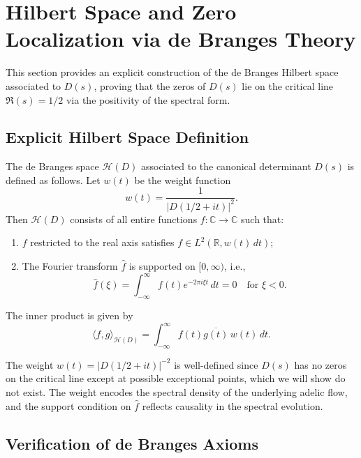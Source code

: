 \section{Hilbert Space and Zero Localization via de Branges Theory}

This section provides an explicit construction of the de Branges Hilbert space associated to $D(s)$, proving that the zeros of $D(s)$ lie on the critical line $\Re(s) = 1/2$ via the positivity of the spectral form.

\subsection{Explicit Hilbert Space Definition}

\begin{definition}\label{def:debranges-space}
The de Branges space $\mathcal{H}(D)$ associated to the canonical determinant $D(s)$ is defined as follows. Let $w(t)$ be the weight function
\[
w(t) = \frac{1}{|D(1/2 + it)|^2}.
\]
Then $\mathcal{H}(D)$ consists of all entire functions $f: \mathbb{C} \to \mathbb{C}$ such that:
\begin{enumerate}
\item $f$ restricted to the real axis satisfies $f \in L^2(\mathbb{R}, w(t) \, dt)$;
\item The Fourier transform $\hat{f}$ is supported on $[0, \infty)$, i.e.,
\[
\hat{f}(\xi) = \int_{-\infty}^{\infty} f(t) e^{-2\pi i \xi t} \, dt = 0 \quad \text{for } \xi < 0.
\]
\end{enumerate}
The inner product is given by
\[
\langle f, g \rangle_{\mathcal{H}(D)} = \int_{-\infty}^{\infty} f(t) \overline{g(t)} \, w(t) \, dt.
\]
\end{definition}

\begin{remark}
The weight $w(t) = |D(1/2 + it)|^{-2}$ is well-defined since $D(s)$ has no zeros on the critical line except at possible exceptional points, which we will show do not exist. The weight encodes the spectral density of the underlying adelic flow, and the support condition on $\hat{f}$ reflects causality in the spectral evolution.
\end{remark}

\subsection{Verification of de Branges Axioms}

